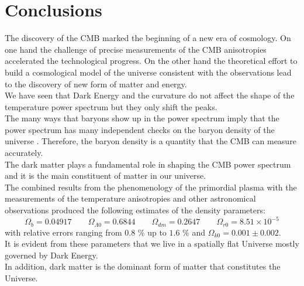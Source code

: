 \documentclass{article}
\begin{document}
\section{Conclusions}
The discovery of the CMB marked the beginning of a new era of cosmology.
On one hand the challenge of precise measurements of the CMB anisotropies accelerated the technological progress.
On the other hand the theoretical effort to build a cosmological model of the universe consistent with the observations lead to the discovery of new form of matter and energy.\\
We have seen that Dark Energy and the curvature do not affect the shape of the temperature power spectrum but they only shift the peaks.\\
The many ways that baryons show up in the power spectrum imply that the power spectrum has many independent checks on the baryon density of the universe \cite{huweb}.  
Therefore, the baryon density is a quantity that the CMB can measure accurately.\\
The dark matter plays a fundamental role in shaping the CMB power spectrum and it is the main constituent of matter in our universe.\\
The combined results from the phenomenology of the primordial plasma with the measurements of the temperature anisotropies and other astronomical observations produced the following estimates of the density parameters:
\begin{equation*}
    \Omega_{b} = 0.04917 
\qquad \Omega_{\Lambda 0} = 0.6844 \qquad \Omega_{dm} = 0.2647
\qquad \Omega_{r0} = 8.51 \times 10^{-5} 
\end{equation*}
with relative errors ranging from $0.8$ \% up to $1.6$ \% and $\Omega_{k0} = 0.001 \pm 0.002$.\\
It is evident from these parameters that we live in a spatially flat Universe mostly governed by Dark Energy.\\
In addition, dark matter is the dominant form of matter that constitutes the Universe.












\nocite{*}



\end{document}
